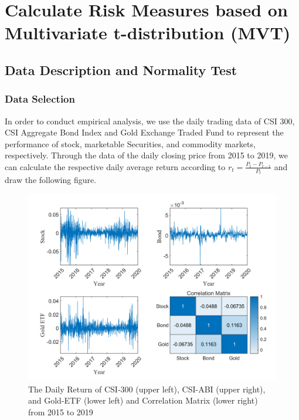 \section{Calculate Risk Measures based on Multivariate t-distribution (MVT)}
\subsection{Data Description and Normality Test}
\subsubsection{Data Selection}
In order to conduct empirical analysis, we use the daily trading data of CSI 300, CSI Aggregate Bond Index and Gold Exchange Traded Fund to represent the performance of stock, marketable Securities, and commodity markets, respectively. Through the data of the daily closing price from 2015 to 2019, we can calculate the respective daily average return according to $r_{t}=\frac{P_{t}-P_{t-1}}{P_{t}}$ and draw the following figure.
\begin{figure}[H]
    \centering
    \includegraphics[scale=1]{Figure/FIG1-Daily-Return.png}
    \caption{The Daily Return of CSI-300 (upper left), CSI-ABI (upper right), and
Gold-ETF (lower left) and Correlation Matrix (lower right) from 2015 to 2019}
    \label{Fig1}
\end{figure}

